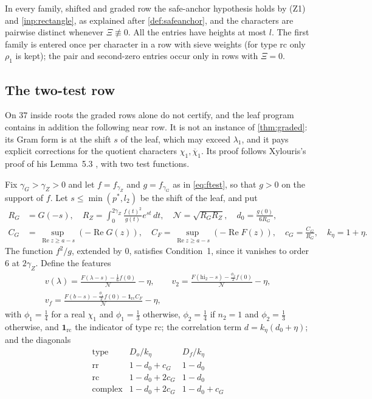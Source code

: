 \documentclass[11pt]{amsart}
\numberwithin{equation}{section}
\theoremstyle{plain}
\theoremstyle{definition}
\theoremstyle{remark}
\renewcommand{\Re}{\operatorname{Re}}
\newcommand{\hi}{\mathrm{hi}}
\newcommand{\1}{\mathbf{1}}
\newcommand{\bchi}{\overline{\chi}}
\begin{document}
In every family, shifted and graded row the safe-anchor hypothesis holds by (Z1) and
\cref{inp:rectangle}, as explained after \cref{def:safeanchor}, and the characters are pairwise distinct
whenever $\Xi\not\equiv0$. All the
entries have heights at most $l$. The first family is entered once per character in a row with
sieve weights (for type $\mathrm{rc}$ only $\rho_1$ is kept); the pair and second-zero entries occur only
in rows with $\Xi=0$.

\subsection{The two-test row}\label{subsec:twotest}
On $37$ inside roots the graded rows alone do not certify, and the leaf program contains in
addition the following near row. It is not an instance of \cref{thm:graded}: its Gram form is at
the shift $s$ of the leaf, which may exceed $\lambda_1$, and it pays explicit corrections for the
quotient characters $\chi_1,\bchi_1$. Its proof follows Xylouris's proof of his Lemma~5.3
\cite[(5.34)--(5.40), pp.~72--76]{Xylouris2011nullstellen}, with two test functions.

Fix $\gamma_G>\gamma_Z>0$ and let $f=f_{\gamma_Z}$ and $g=f_{\gamma_G}$ as in \eqref{eq:ftest}, so that $g>0$ on the
support of $f$. Let $s\le\min(p^*,l_2)$ be the shift of the leaf, and put
\begin{align*}
  R_G&=G(-s),\quad R_Z=\int_0^{2\gamma_Z}\frac{f(t)^2}{g(t)}e^{st}\,dt,\quad \mathcal N=\sqrt{R_GR_Z},\quad
  d_0=\frac{g(0)}{6R_G},\\
  C_G&=\sup_{\Re z\ge a-s}(-\Re G(z)),\quad C_F=\sup_{\Re z\ge a-s}(-\Re F(z)),\quad c_G=\frac{C_G}{R_G},\quad k_\eta=1+\eta .
\end{align*}
The function $f^2/g$, extended by $0$, satisfies Condition~1, since it vanishes to order $6$ at
$2\gamma_Z$. Define the features
\begin{gather*}
  v(\lambda)=\frac{F(\lambda-s)-\frac16f(0)}{\mathcal N}-\eta,\qquad
  v_2=\frac{F(\hi_2-s)-\frac{\phi_2}2f(0)}{\mathcal N}-\eta,\\
  v_f=\frac{F(b-s)-\frac{\phi_1}2f(0)-\1_{\mathrm{rc}}C_F}{\mathcal N}-\eta,
\end{gather*}
with $\phi_1=\frac14$ for a real $\chi_1$ and $\phi_1=\frac13$ otherwise, $\phi_2=\frac14$ if $n_2=1$ and
$\phi_2=\frac13$ otherwise, and $\1_{\mathrm{rc}}$ the indicator of type $\mathrm{rc}$; the correlation term $d=k_\eta(d_0+\eta)$; and the diagonals
\[
  \begin{array}{lll}
    \text{type} & D_o/k_\eta & D_f/k_\eta\\
    \mathrm{rr} & 1-d_0+c_G & 1-d_0\\
    \mathrm{rc} & 1-d_0+2c_G & 1-d_0\\
    \mathrm{complex} & 1-d_0+2c_G & 1-d_0+c_G
  \end{array}
\]
\end{document}
